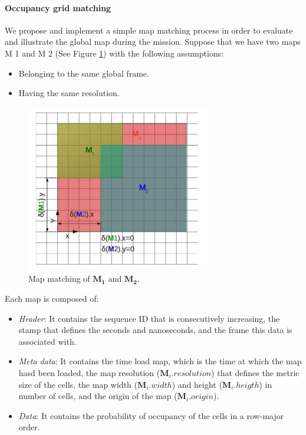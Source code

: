 \documentclass[11pt,openany]{book}
\begin{document}
\paragraph{Occupancy grid matching}
We propose and implement a simple map matching process in order to evaluate and illustrate the global map during the mission. Suppose that we have two maps M 1 and M 2 (See Figure \ref{fig:2.8}) with the following assumptions:
\begin{itemize}
    \item Belonging to the same global frame.
    \item Having the same resolution.
\end{itemize}
\begin{figure}[H]
    \centering
    \includegraphics[width=\linewidth]{assets/2_8.png}
    \caption{Map matching of $\mathbf{M_1}$ and $\mathbf{M_2}$.}
    \label{fig:2.8}
\end{figure}
Each map is composed of:
\begin{itemize}
    \item \textit{Header}: It contains the sequence ID that is consecutively increasing, the stamp that deﬁnes the seconds and nanoseconds, and the frame this data is associated with.
    \item \textit{Meta data}: It contains the time load map, which is the time at which the map hasd been loaded, the map resolution ($\mathbf{M}_i.resolution$) that deﬁnes the metric size of the cells, the map width ($\mathbf{M}_i.width$) and height ($\mathbf{M}_i.heigth$) in number of cells, and the origin of the map ($\mathbf{M}_i.origin$).
    \item \textit{Data}: It contains the probability of occupancy of the cells in a row-major order.
\end{itemize}
\end{document}
